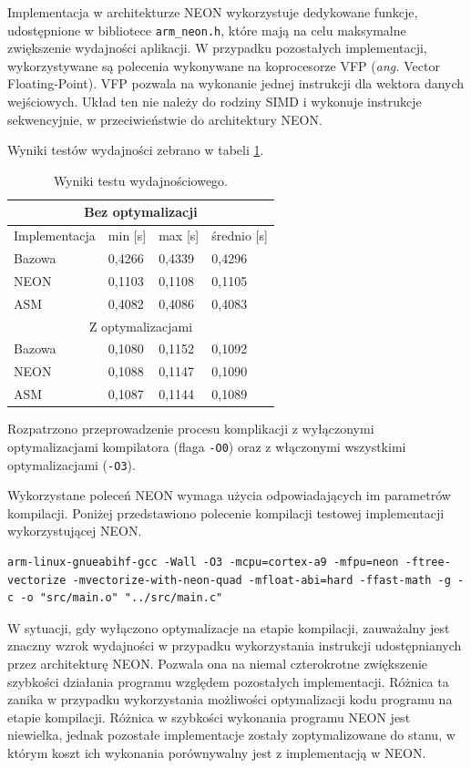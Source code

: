 Implementacja w architekturze NEON wykorzystuje dedykowane funkcje, udostępnione w bibliotece \texttt{arm\_neon.h}, które mają na celu maksymalne zwiększenie wydajności aplikacji. W przypadku pozostałych implementacji, wykorzystywane są polecenia wykonywane na koprocesorze VFP (\emph{ang.} Vector Floating-Point). VFP pozwala na wykonanie jednej instrukcji dla wektora danych wejściowych. Układ ten nie należy do rodziny SIMD i wykonuje instrukcje sekwencyjnie, w przeciwieństwie do architektury NEON.


Wyniki testów wydajności zebrano w tabeli \ref{tab:neon-time-results}.

\begin{table}[h]
	\caption{Wyniki testu wydajnościowego.}
	\centering
	\label{tab:neon-time-results}
	\begin{tabular}{|l|l|l|l|}
		\hline
		\multicolumn{4}{|c|}{Bez optymalizacji} \\ \hline
		Implementacja & min {[}s{]} & max {[}s{]} & średnio {[}s{]} \\ \hline
		Bazowa & 0,4266 & 0,4339 & 0,4296 \\ \hline
		NEON & 0,1103 & 0,1108 & 0,1105 \\ \hline
		ASM & 0,4082 & 0,4086 & 0,4083 \\ \hline
		\multicolumn{4}{|c|}{Z optymalizacjami} \\ \hline
		Bazowa & 0,1080 & 0,1152 & 0,1092 \\ \hline
		NEON & 0,1088 & 0,1147 & 0,1090 \\ \hline
		ASM & 0,1087 & 0,1144 & 0,1089 \\ \hline
	\end{tabular}
\end{table}

Rozpatrzono przeprowadzenie procesu komplikacji z wyłączonymi optymalizacjami kompilatora (flaga \texttt{-O0}) oraz z włączonymi wszystkimi optymalizacjami (\texttt{-O3}).

Wykorzystane poleceń NEON wymaga użycia odpowiadających im parametrów kompilacji. Poniżej przedstawiono polecenie kompilacji testowej implementacji wykorzystującej NEON.

\begin{lstlisting}[breaklines]
arm-linux-gnueabihf-gcc -Wall -O3 -mcpu=cortex-a9 -mfpu=neon -ftree-vectorize -mvectorize-with-neon-quad -mfloat-abi=hard -ffast-math -g -c -o "src/main.o" "../src/main.c"
\end{lstlisting}

W sytuacji, gdy wyłączono optymalizacje na etapie kompilacji, zauważalny jest znaczny wzrok wydajności w przypadku wykorzystania instrukcji udostępnianych przez architekturę NEON. Pozwala ona na niemal czterokrotne zwiększenie szybkości działania programu względem pozostałych implementacji. Różnica ta zanika w przypadku wykorzystania możliwości optymalizacji kodu programu na etapie kompilacji. Różnica w szybkości wykonania programu NEON jest niewielka, jednak pozostałe implementacje zostały zoptymalizowane do stanu, w którym koszt ich wykonania porównywalny jest z implementacją w NEON.

